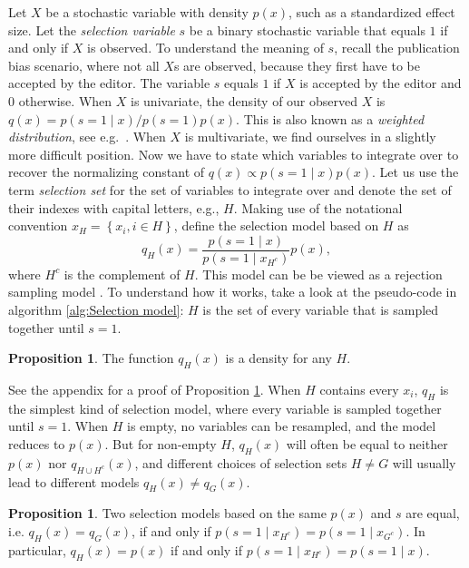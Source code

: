\documentclass{article}
\theoremstyle{plain}
\theoremstyle{definition}
\newtheorem{prop}[theorem]{Proposition}
\begin{document}
Let $X$ be a stochastic variable with density $p(x)$, such as a standardized effect size. Let the \emph{selection variable} $s$ be a binary stochastic variable that equals $1$ if and only if $X$ is observed. To understand the meaning of $s$, recall the publication bias scenario, where not all $X$s are observed, because they first have to be accepted by the editor. The variable $s$ equals $1$ if $X$ is accepted by the editor and $0$ otherwise. When $X$ is univariate, the density of our observed $X$ is $q(x)=p(s=1\mid x)/p(s=1)p(x)$. This is also known as a \emph{weighted distribution}, see e.g.\ \citep[][eq. 3.1]{rao1985weighted}. When $X$ is multivariate, we find ourselves in a slightly more difficult position. Now we have to state which variables to integrate over to recover the normalizing constant of $q(x)\propto p(s=1\mid x)p(x)$. Let us use the term \emph{selection set} for the set of variables to integrate over and denote the set of their indexes with capital letters, e.g., $H$. Making use of the notational convention $x_{H}=\left\{ x_{i},i\in H\right\}$, define the selection model based on $H$ as
\begin{equation}
q_{H}(x)=\frac{p(s=1\mid x)}{p(s=1\mid x_{H^{c}})}p(x)\label{eq:H-selection model},
\end{equation}
where $H^c$ is the complement of $H$. This model can be be viewed as a rejection sampling model \citep{von1951various}. To understand how it works, take a look at the pseudo-code in algorithm \ref{alg:Selection model}: $H$ is the set of every variable that is sampled together until $s=1$.

\begin{prop}\label{prop:is density}
The function $q_{H}(x)$ is a density for any $H$.
\end{prop}
See the appendix for a proof of Proposition \ref{prop:is density}. When $H$ contains every $x_i$, $q_H$ is the simplest kind of selection model, where every variable is sampled together until $s=1$. When $H$ is empty, no variables can be resampled, and the model reduces to $p(x)$. But for non-empty $H$, $q_{H}(x)$ will often be equal to neither $p(x)$ nor $q_{H\cup H^c}(x)$, and different choices of selection sets $H\neq G$ will usually lead to different models $q_{H}(x)\neq q_{G}(x)$. 
\begin{prop}
\label{prop:Equal selection models}Two selection models based on the same $p(x)$ and $s$ are equal, i.e. $q_{H}(x)=q_{G}(x)$, if and only if $p(s=1\mid x_{H^{c}})=p(s=1\mid x_{G^{c}})$.
In particular, $q_{H}(x)=p(x)$ if and only if $p(s=1\mid x_{H^{c}})=p(s=1\mid x)$.
\end{prop}
\end{document}
